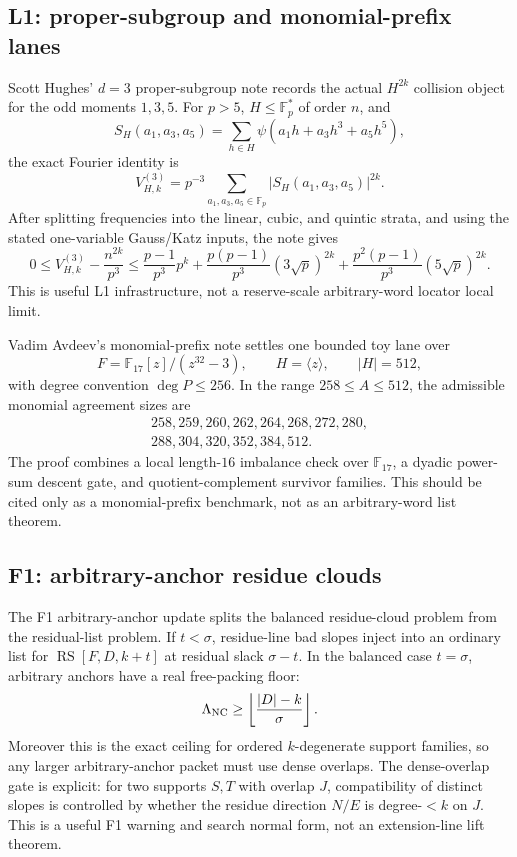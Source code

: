 \documentclass[11pt]{article}
\newcommand{\F}{\mathbb F}
\newcommand{\RS}{\operatorname{RS}}
\begin{document}
\subsection{L1: proper-subgroup and monomial-prefix lanes}

Scott Hughes' \(d=3\) proper-subgroup note records the actual \(H^{2k}\)
collision object for the odd moments \(1,3,5\).  For \(p>5\), \(H\le\F_p^*\)
of order \(n\), and
\[
  S_H(a_1,a_3,a_5)
  =
  \sum_{h\in H}\psi(a_1h+a_3h^3+a_5h^5),
\]
the exact Fourier identity is
\[
  V_{H,k}^{(3)}
  =
  p^{-3}\sum_{a_1,a_3,a_5\in\F_p}
  |S_H(a_1,a_3,a_5)|^{2k}.
\]
After splitting frequencies into the linear, cubic, and quintic strata, and
using the stated one-variable Gauss/Katz inputs, the note gives
\[
0\le
V_{H,k}^{(3)}-\frac{n^{2k}}{p^3}
\le
\frac{p-1}{p^3}p^k
+\frac{p(p-1)}{p^3}(3\sqrt p)^{2k}
+\frac{p^2(p-1)}{p^3}(5\sqrt p)^{2k}.
\]
This is useful L1 infrastructure, not a reserve-scale arbitrary-word locator
local limit.

Vadim Avdeev's monomial-prefix note settles one bounded toy lane over
\[
  F=\F_{17}[z]/(z^{32}-3),\qquad H=\langle z\rangle,\qquad |H|=512,
\]
with degree convention \(\deg P\le256\).  In the range \(258\le A\le512\),
the admissible monomial agreement sizes are
\[
\begin{gathered}
258,259,260,262,264,268,272,280,\\
288,304,320,352,384,512.
\end{gathered}
\]
The proof combines a local length-\(16\) imbalance check over \(\F_{17}\), a
dyadic power-sum descent gate, and quotient-complement survivor families.  This
should be cited only as a monomial-prefix benchmark, not as an arbitrary-word
list theorem.

\subsection{F1: arbitrary-anchor residue clouds}

The F1 arbitrary-anchor update splits the balanced residue-cloud problem from
the residual-list problem.  If \(t<\sigma\), residue-line bad slopes inject into
an ordinary list for \(\RS[F,D,k+t]\) at residual slack \(\sigma-t\).  In the
balanced case \(t=\sigma\), arbitrary anchors have a real free-packing floor:
\[
  \Lambda_{\rm NC}
  \ge
  \left\lfloor\frac{|D|-k}{\sigma}\right\rfloor.
\]
Moreover this is the exact ceiling for ordered \(k\)-degenerate support
families, so any larger arbitrary-anchor packet must use dense overlaps.  The
dense-overlap gate is explicit: for two supports \(S,T\) with overlap \(J\),
compatibility of distinct slopes is controlled by whether the residue direction
\(N/E\) is degree-\(<k\) on \(J\).  This is a useful F1 warning and search
normal form, not an extension-line lift theorem.
\end{document}
